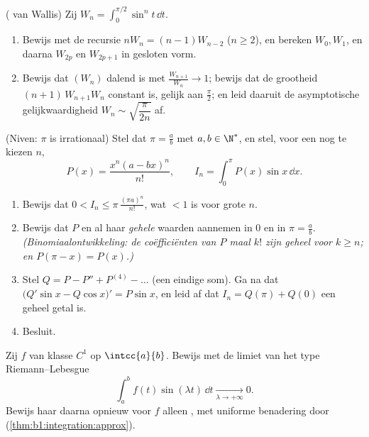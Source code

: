 \begin{exercise}[$\star\star\star$]\label{exo:b1:integration:8}
( van Wallis) Zij $W_n = \int_0^{\pi/2} \sin^n t\,\dd t$.
\begin{enumerate}
  \item Bewijs met  de recursie $n W_n = (n-1)
        W_{n-2}$ ($n \geq 2$), en bereken $W_0, W_1$, en daarna
        $W_{2p}$ en $W_{2p+1}$ in gesloten vorm.
  \item Bewijs dat $(W_n)$ dalend is met $\frac{W_{n+1}}{W_n} \to
        1$; bewijs dat de grootheid $(n+1)\,W_{n+1} W_n$ constant
        is, gelijk aan $\frac\pi2$; en leid daaruit de
        asymptotische gelijkwaardigheid $W_n \sim
        \sqrt{\dfrac{\pi}{2n}}$ af.
\end{enumerate}
\end{exercise}

\begin{exercise}[$\star\star\star$]\label{exo:b1:integration:9}
(Niven: $\pi$ is irrationaal) Stel dat $\pi = \frac ab$ met $a, b
\in \N^*$, en stel, voor een nog te kiezen $n$,
\[
P(x) = \frac{x^n (a - bx)^n}{n!},
\qquad
I_n = \int_0^{\pi} P(x)\sin x\, \dd x .
\]
\begin{enumerate}
  \item Bewijs dat $0 < I_n \leq \pi\,\frac{(\pi a)^n}{n!}$, wat $<
        1$ is voor grote $n$.
  \item Bewijs dat $P$ en al haar  \emph{gehele} waarden
        aannemen in $0$ en in $\pi = \frac ab$.
        \emph{(Binomiaalontwikkeling: de coëfficiënten van $P$ maal
        $k!$ zijn geheel voor $k \geq n$; en $P(\pi - x) = P(x)$.)}
  \item Stel $Q = P - P'' + P^{(4)} - \dots$ (een eindige som). Ga
        na dat $\bigl(Q'\sin x - Q\cos x\bigr)' = P \sin x$, en leid
        af dat $I_n = Q(\pi) + Q(0)$ een geheel getal is.
  \item Besluit.
\end{enumerate}
\end{exercise}

\begin{exercise}[$\star\star\star$]\label{exo:b1:integration:10}
Zij $f$ van klasse $C^1$ op $\intcc{a}{b}$. Bewijs met  de limiet van het type Riemann--Lebesgue
\[
\int_a^b f(t)\sin(\lambda t)\,\dd t \xrightarrow[\lambda \to
+\infty]{} 0 .
\]
Bewijs haar daarna opnieuw voor $f$ alleen , met uniforme
benadering door 
(\cref{thm:b1:integration:approx}).
\end{exercise}

